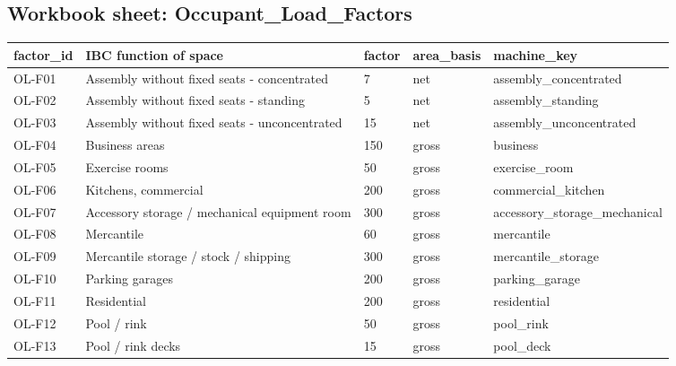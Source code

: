 \documentclass[10pt]{article}
\begin{document}
{\subsection*{Workbook sheet: Occupant\_Load\_Factors}
\begin{longtable}{p{3.12cm}p{3.12cm}p{3.12cm}p{3.12cm}p{3.12cm}}
\toprule
\textbf{factor\_id} & \textbf{IBC function of space} & \textbf{factor} & \textbf{area\_basis} & \textbf{machine\_key} \\ \midrule \endhead
OL-F01 & Assembly without fixed seats - concentrated & 7 & net & assembly\_concentrated \\
OL-F02 & Assembly without fixed seats - standing & 5 & net & assembly\_standing \\
OL-F03 & Assembly without fixed seats - unconcentrated & 15 & net & assembly\_unconcentrated \\
OL-F04 & Business areas & 150 & gross & business \\
OL-F05 & Exercise rooms & 50 & gross & exercise\_room \\
OL-F06 & Kitchens, commercial & 200 & gross & commercial\_kitchen \\
OL-F07 & Accessory storage / mechanical equipment room & 300 & gross & accessory\_storage\_mechanical \\
OL-F08 & Mercantile & 60 & gross & mercantile \\
OL-F09 & Mercantile storage / stock / shipping & 300 & gross & mercantile\_storage \\
OL-F10 & Parking garages & 200 & gross & parking\_garage \\
OL-F11 & Residential & 200 & gross & residential \\
OL-F12 & Pool / rink & 50 & gross & pool\_rink \\
OL-F13 & Pool / rink decks & 15 & gross & pool\_deck \\
\bottomrule\end{longtable}
}
\end{document}
